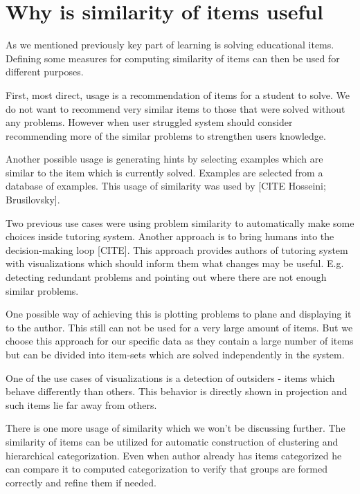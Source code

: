 \documentclass[
  digital, %
  table,   %
  nolof,     %
  nolot,     %
  nocover
]{fithesis3}
\begin{document}
\section{Why is similarity of items useful}\label{why-is-similarity-of-items-useful}


As we mentioned previously key part of learning is solving educational items. Defining some measures for computing similarity of items can then be used for different purposes.

First, most direct, usage is a recommendation of items for a student to solve. We do not want to recommend very similar items to those that were solved without any problems. However when user struggled system should consider recommending more of the similar problems to strengthen users knowledge.

Another possible usage is generating hints by selecting examples which are similar to the item which is currently solved. Examples are selected from a database of examples. This usage of similarity was used by [CITE Hosseini; Brusilovsky].

Two previous use cases were using problem similarity to automatically make some choices inside tutoring system. Another approach is to bring humans into the decision-making loop [CITE]. This approach provides authors of tutoring system with visualizations which should inform them what changes may be useful. E.g. detecting redundant problems and pointing out where there are not enough similar problems.

One possible way of achieving this is plotting problems to plane and displaying it to the author. This still can not be used for a very large amount of items. But we choose this approach for our specific data as they contain a large number of items but can be divided into item-sets which are solved independently in the system.

One of the use cases of visualizations is a detection of outsiders - items which behave differently than others. This behavior is directly shown in projection and such items lie far away from others.

There is one more usage of similarity which we won't be discussing further. The similarity of items can be utilized for automatic construction of clustering and hierarchical categorization. Even when author already has items categorized he can compare it to computed categorization to verify that groups are formed correctly and refine them if needed.
\end{document}

